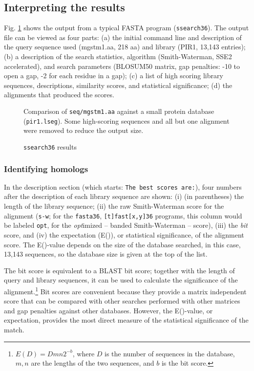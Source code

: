 \documentclass[11pt]{article}
\begin{document}
\subsection{Interpreting the results}

Fig. \ref{ssearch_run} shows the output from a typical FASTA program
(\texttt{ssearch36}).  The output file can be
viewed as four parts: (a) the initial command line and description of
the query sequence used (mgstm1.aa, 218 aa) and library (PIR1, 13,143
entries); (b) a description of the search statistics, algorithm
(Smith-Waterman, SSE2 accelerated), and search parameters (BLOSUM50
matrix, gap penalties: -10 to open a gap, -2 for each residue in a
gap); (c) a list of high scoring library sequences, descriptions, similarity scores, and statistical significance; (d) the alignments that produced the scores.

\begin{figure}

\caption{\label{ssearch_run}\texttt{ssearch36} results}
\vspace{1.0ex}
Comparison of \texttt{seq/mgstm1.aa} against a small protein database
(\texttt{pir1.lseg}). Some high-scoring sequences and all but one
alignment were removed to reduce the output size.
\end{figure}

\subsubsection{Identifying homologs}
In the description section (which starts: \texttt{The best scores
  are:}), four numbers after the description of each library sequence
are shown: (i) (in parentheses) the length of the library sequence;
(ii) the raw Smith-Waterman score for the alignment (\texttt{s-w}; for
the \texttt{fasta36}, \texttt{[t]fast[x,y]36} programs, this column
would be labeled \texttt{opt}, for the \emph{opt}imized -- banded
Smith-Waterman -- score), (iii) the \emph{bit} score, and (iv) the
expectation (E()), or statistical significance, of the alignment
score.  The E()-value depends on the size of the database searched, in
this case, 13,143 sequences, so the database size is given at the top
of the list.

The bit score is equivalent to a BLAST bit score; together with the
length of query and library sequences, it can be used to calculate the
significance of the alignment.\footnote{$E(D) = D m n 2^{-b}$,
where $D$ is the number of sequences in the database, $m, n$ are the
lengths of the two sequences, and $b$ is the bit score.}  Bit scores
are convenient because they provide a matrix independent score that
can be compared with other searches performed with other matrices and
gap penalties against other databases.  However, the E()-value, or
expectation, provides the most direct measure of the statistical
significance of the match.
\end{document}
